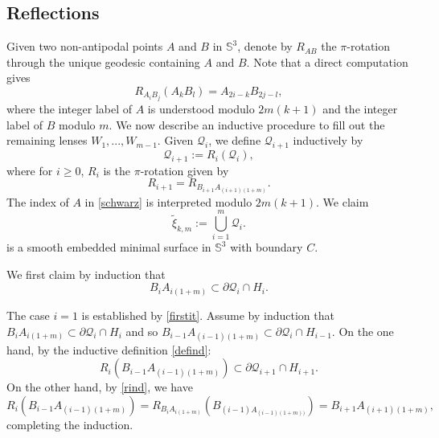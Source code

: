 \documentclass[11pt, reqno]{amsart}
\numberwithin{equation}{section}
\begin{document}
\subsection{Reflections}
Given two non-antipodal points $A$ and $B$ in $\mathbb{S}^3$, denote by $R_{AB}$ the $\pi$-rotation through the unique geodesic containing $A$ and $B$.  Note that a direct computation gives
\begin{equation}\label{rind}
R_{A_iB_j}(A_kB_l) = A_{2i-k}B_{2j-l}, 
\end{equation}
where the integer label of $A$ is understood modulo $2m(k+1)$ and the integer label of $B$ modulo $m$.
We now describe an inductive procedure to fill out the remaining lenses $W_1,...,W_{m-1}$. Given $\mathcal{Q}_i$, we define $\mathcal{Q}_{i+1}$ inductively by
\begin{equation}\label{defind}
\mathcal{Q}_{i+1}:=R_i(\mathcal{Q}_i), 
\end{equation}
where for $i\geq 0$, $R_i$ is the $\pi$-rotation given by 
\begin{equation}\label{schwarz}
R_{i+1}=R_{B_{i+1}A_{(i+1)(1+m)}}.
\end{equation}
The index of $A$ in \eqref{schwarz} is interpreted modulo $2m(k+1)$.
We claim
\begin{equation}
\tilde{\xi}_{k,m}:=\bigcup_{i=1}^m \mathcal{Q}_i.
\end{equation}
is a smooth embedded minimal surface in $\mathbb{S}^3$ with boundary $C$.

We first claim by induction that \begin{equation}\label{axiswhere}B_{i}A_{i(1+m)}\subset \partial\mathcal{Q}_i \cap H_i.\end{equation} 


The case $i=1$ is established by \eqref{firstit}.  Assume by induction that $B_{i}A_{i(1+m)}\subset \partial\mathcal{Q}_{i} \cap H_i$ and so $B_{i-1}A_{(i-1)(1+m)}\subset \partial\mathcal{Q}_{i}\cap H_{i-1}$.  On the one hand,  by the inductive definition \eqref{defind}:
\begin{equation}
R_{i}(B_{i-1}A_{(i-1)(1+m)})\subset\partial \mathcal{Q}_{i+1}\cap H_{i+1}.\end{equation}  
On the other hand, by \eqref{rind}, we have
\begin{equation}
R_{i}(B_{i-1}A_{(i-1)(1+m)})=R_{B_iA_{i(1+m)}} (B_{(i-1)A_{(i-1)(1+m))}})=   B_{i+1}A_{(i+1)(1+m)}, 
\end{equation}
completing the induction.
\end{document}
